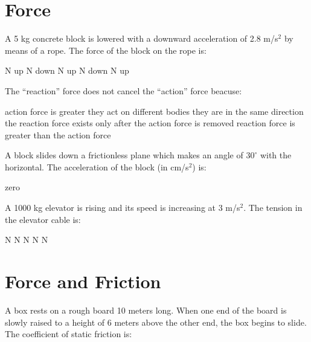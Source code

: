 \begin{questions}
  \section{Force}
  
  \question[2] A 5 kg concrete block is lowered with a downward
  acceleration of 2.8 m/s$^2$ by means of a rope. The force of the
  block on the rope is:
  \begin{oneparchoices}
     N up
     N down
     N up
     N down
     N up
  \end{oneparchoices}
  
  \question[2] The ``reaction'' force does not cancel the ``action''
  force beacuse:
  \begin{oneparchoices}
    \choice action force is greater
    \CorrectChoice they act on different bodies
    \choice they are in the same direction
    \choice the reaction force exists only after the action force is
    removed
    \choice reaction force is greater than the action force
  \end{oneparchoices}
  
  \question[2] A block slides down a frictionless plane which makes
  an angle of $30^\circ$ with the horizontal. The acceleration of
  the block (in cm/s$^2$) is:
  \begin{oneparchoices}
    \choice zero
  \end{oneparchoices}
  
  \question[2] A 1000 kg elevator is rising and its speed is
  increasing at 3 m/s$^2$. The tension in the elevator cable is:
  \begin{oneparchoices}
     N
     N
     N
     N
     N
  \end{oneparchoices}
  
  \section{Force and Friction}
  
  \question[2] A box rests on a rough board 10 meters long. When one
  end of the board is slowly raised to a height of 6 meters above the
  other end, the box begins to slide. The coefficient of static
  friction is:
  \begin{oneparchoices}
  \end{oneparchoices}


\end{questions}
